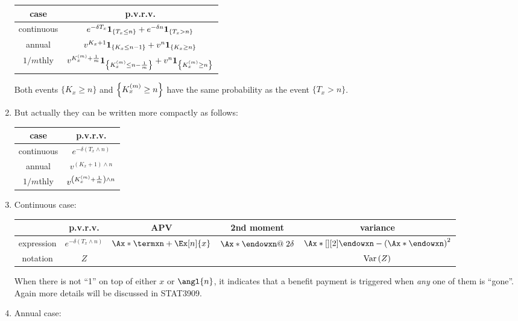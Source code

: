 \begin{enumerate}
\begin{tabular}{cc}
\toprule
case&p.v.r.v.\\
\midrule
continuous&\(e^{-\delta T_x}\mathbf{1}_{\left\{T_x\le n\right\}}+e^{-\delta n}\mathbf{1}_{\left\{T_x>n\right\}}\)\\
annual&\(v^{K_x+1}\mathbf{1}_{\left\{K_x\le n-1\right\}}+v^n\mathbf{1}_{\left\{K_x\ge n\right\}}\)\\
\(1/m\)thly&\(v^{K_x^{(m)}+\frac{1}{m}}\mathbf{1}_{\left\{K_x^{(m)}\le n-\frac{1}{m}\right\}}+v^n\mathbf{1}_{\left\{K_x^{(m)}\ge n\right\}}\)\\
\bottomrule
\end{tabular}

\begin{note}
Both events \(\{K_x\ge n\}\) and \(\qty{K_x^{(m)}\ge n}\) have the same probability as
the event \(\{T_x> n\}\).
\end{note}
\item But actually they can be written more compactly as follows:

\begin{tabular}{cc}
\toprule
case&p.v.r.v.\\
\midrule
continuous&\(e^{-\delta(T_x\wedge n)}\)\\
annual&\(v^{(K_x+1)\wedge n}\)\\
\(1/m\)thly&\(v^{\qty(K_x^{(m)}+\frac{1}{m})\wedge n}\)\\
\bottomrule
\end{tabular}
\item \label{it:cts-endow-fmlas}
Continuous case:

\begin{tabular}{ccccc}
\toprule
&p.v.r.v.&APV&2nd moment&variance\\
\midrule
expression&\(e^{-\delta(T_x\wedge n)}\)&\(\Ax*{\termxn}+\Ex[n]{x}\)
&\(\Ax*{\endowxn}@\;2\delta\)&\(\Ax*[][2]{\endowxn}-\qty(\Ax*{\endowxn})^2\)\\
notation&\(Z\)&\defn{\(\Ax*{\endowxn}\)}
&{\(\Ax*[][2]{\endowxn}\)}
&\(\operatorname{Var}\qty(Z)\)\\
\bottomrule
\end{tabular}

\begin{note}
When there is not ``1'' on top of either \(x\) or \(\angl{n}\), it indicates
that a benefit payment is triggered when \emph{any} one of them is ``gone''.
Again more details will be discussed in STAT3909.
\end{note}

\item \label{it:annual-endow-fmlas}
Annual case:


\end{enumerate}
